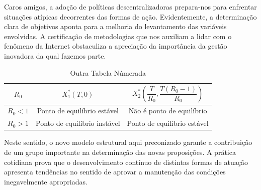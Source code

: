 \documentclass[fleqn]{icat-ufal}
\begin{document}
Caros amigos, a adoção de políticas descentralizadoras prepara-nos para enfrentar
situações atípicas decorrentes das formas de ação. Evidentemente, a determinação
clara de objetivos aponta para a melhoria do levantamento das variáveis
envolvidas. A certificação de metodologias que nos auxiliam a lidar com o
fenômeno da Internet obstaculiza a apreciação da importância da gestão inovadora
da qual fazemos parte. 

\begin{table}
  \begin{center}
    \caption{Outra Tabela Númerada}
    \label{tab:outra_tabela_numerada}
    \begin{tabular}{|c|c|c|}
    	\hline
    	$\displaystyle R_0$ & $\displaystyle X_1^* (T,0)$  & $\displaystyle X_2^* \left( \dfrac{T}{R_0}, \dfrac{T(R_0-1)}{R_0}\right)$ \rule[-3ex]{0pt}{7.3ex} \\ \hline\hline
    	      $R_0<1$       & Ponto de equilíbrio estável  &                         Não é ponto de equilíbrio   \rule[-2ex]{0pt}{5ex}                         \\
    	      $R_0>1$       & Ponto de equilíbrio instável &                         Ponto de equilíbrio estável \rule[-2ex]{0pt}{3ex}                         \\ \hline
    \end{tabular}
  \end{center}
\end{table}

Neste sentido, o novo modelo estrutural aqui preconizado garante a contribuição
de um grupo importante na determinação das novas proposições. A prática
cotidiana prova que o desenvolvimento contínuo de distintas formas de atuação
apresenta tendências no sentido de aprovar a manutenção das condições
inegavelmente apropriadas. 
\end{document}
